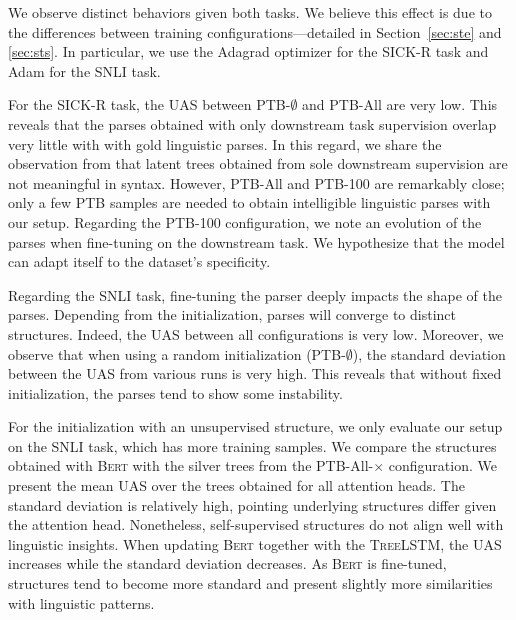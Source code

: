 We observe distinct behaviors given both tasks. We believe this effect is due to the differences between training configurations—detailed in Section~\ref{sec:ste} and \ref{sec:sts}. In particular, we use the Adagrad optimizer for the SICK-R task and Adam for the SNLI task.

For the SICK-R task, the UAS between PTB-$\emptyset$ and PTB-All are very low. This reveals that the parses obtained with only downstream task supervision overlap very little with with gold linguistic parses. In this regard, we share the observation from \textcite{williams_18} that latent trees obtained from sole downstream supervision are not meaningful in syntax. However, PTB-All and PTB-100 are remarkably close; only a few PTB samples are needed to obtain intelligible linguistic parses with our setup. Regarding the PTB-100 configuration, we note an evolution of the parses when fine-tuning on the downstream task. We hypothesize that the model can adapt itself to the dataset's specificity. 

Regarding the SNLI task, fine-tuning the parser deeply impacts the shape of the parses. Depending from the initialization, parses will converge to distinct structures. Indeed, the UAS between all configurations is very low. Moreover, we observe that when using a random initialization (PTB-$\emptyset$), the standard deviation between the UAS from various runs is very high. This reveals that without fixed initialization, the parses tend to show some instability.

For the initialization with an unsupervised structure, we only evaluate our setup on the SNLI task, which has more training samples. We compare the structures obtained with \textsc{Bert} with the silver trees from the PTB-All-$\times$ configuration. We present the mean UAS over the trees obtained for all attention heads. The standard deviation is relatively high, pointing underlying structures differ given the attention head. Nonetheless, self-supervised structures do not align well with linguistic insights. When updating \textsc{Bert} together with the \textsc{TreeLSTM}, the UAS increases while the standard deviation decreases. As \textsc{Bert} is fine-tuned, structures tend to become more standard and present slightly more similarities with linguistic patterns.


